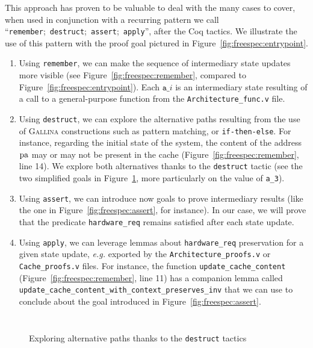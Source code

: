 This approach has proven to be valuable to deal with the many cases to cover,
when used in conjunction with a recurring pattern we call
``\texttt{remember};~\texttt{destruct};~\texttt{assert};~\texttt{apply}'', after
the Coq tactics.
%
We illustrate the use of this pattern with the proof goal pictured in
Figure~\ref{fig:freespec:entrypoint}.
%
\begin{enumerate}
\item Using \texttt{remember}, we can make the sequence of intermediary state
  updates more visible (see Figure~\ref{fig:freespec:remember}, compared to
  Figure~\ref{fig:freespec:entrypoint}).
  Each \( \mathtt{a\_}i \) is an intermediary state resulting of a call to a
  general-purpose function from the \texttt{Architecture\_func.v} file.
\item Using \texttt{destruct}, we can explore the alternative paths resulting
  from the use of {\scshape Gallina} constructions such as pattern matching, or
  \texttt{if-then-else}.
  For instance, regarding the initial state of the system, the content of the
  address \( \mathrm{pa} \) may or may not be present in the cache
  (Figure~\ref{fig:freespec:remember}, line 14).
  We explore both alternatives thanks to the \texttt{destruct} tactic (see the
  two simplified goals in Figure~\ref{fig:freespec:destruct}, more particularly
  on the value of \texttt{a\_3}).
\item Using \texttt{assert}, we can introduce now goals to prove intermediary
  results (like the one in Figure~\ref{fig:freespec:assert}, for instance).
  In our case, we will prove that the predicate \texttt{hardware\_req} remains
  satisfied after each state update.
\item Using \texttt{apply}, we can leverage lemmas about \texttt{hardware\_req}
  preservation for a given state update, \emph{e.g.} exported by the
  \texttt{Architecture\_proofs.v} or \texttt{Cache\_proofs.v} files.
  For instance, the function \texttt{update\_cache\_content}
  (Figure~\ref{fig:freespec:remember}, line 11) has a companion lemma called
  \texttt{update\_cache\_content\-\_with\_context\_preserves\_inv} that we can
  use to conclude about the goal introduced in Figure~\ref{fig:freespec:assert}.
\end{enumerate}

\begin{figure}
  \inputminted{coq}{Listings/DestructGoal.v}

  \inputminted{coq}{Listings/DestructGoal2.v}

  \caption{Exploring alternative paths thanks to the \texttt{destruct} tactics}
  \label{fig:freespec:destruct}
\end{figure}

